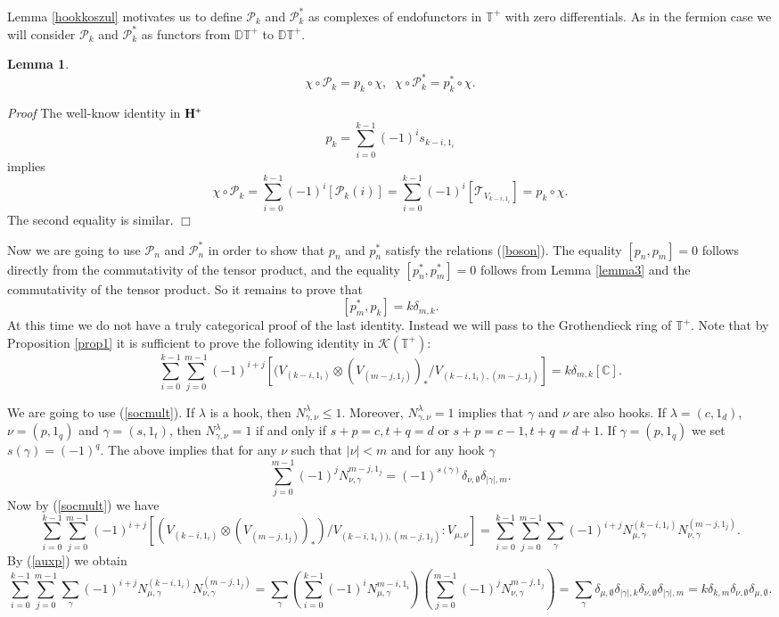 \documentclass[11pt]{amsart}
\newcounter{theorem}
\newtheorem{lemma}[theo]{Lemma}
\renewenvironment{proof}{ \emph{Proof}}{$\Box$}
\newcommand{\TT}{\mathbb{T}}
\begin{document}
Lemma \ref{hookkoszul} motivates us to define $\mathcal P_k$ and $\mathcal P^*_k$ as complexes of endofunctors in $\TT^+$ with zero differentials.
As in the fermion case we will consider $\mathcal P_k$ and $\mathcal P^*_k$ as functors from  $\mathbb{DT}^+$ to $\mathbb{DT}^+$.

\begin{lemma}\label{cath}
$$\chi\circ\mathcal P_k=p_k\circ\chi,\;\;\chi\circ\mathcal P^*_k=p^*_k\circ\chi.$$
\end{lemma} 
\begin{proof} The well-know identity \cite{M} in $\bold{H}^+$
$$p_k=\sum_{i=0}^{k-1} (-1)^i s_{k-i,1_i}$$
implies 
$$\chi\circ\mathcal P_k=\sum_{i=0}^{k-1}(-1)^i[\mathcal P_k(i)]=\sum_{i=0}^{k-1} (-1)^i[\mathcal T_{V_{k-i,1_i}}]=p_k\circ\chi.$$
The second equality is similar.
\end{proof}

Now we are going to use $\mathcal P_n$ and $\mathcal P_n^*$ in order
to show that $p_n$ and $p^*_n$ satisfy the relations
(\ref{boson}). 
The equality $[p_n,p_m]=0$ follows directly from the
commutativity of the tensor product, and the equality  $[p^*_n,p^*_m]=0$ follows from
Lemma \ref{lemma3} and the commutativity of the tensor product. So it
remains to prove that
$$[p_m^*,p_k]=k\delta_{m,k}.$$
At this time we do not have a truly categorical proof of the last identity. Instead we will pass to the Grothendieck ring of
$\TT^+$.
Note that by Proposition \ref{prop1} it is sufficient to prove the
following identity in $\mathcal K(\TT^+)$: 
\begin{equation}\label{hookid}
\sum_{i=0}^{k-1}\sum_{j=0}^{m-1}(-1)^{i+j}[(V_{(k-i,1_i)}\otimes
  (V_{(m-j,1_j)})_*/V_{(k-i,1_i),(m-j,1_j)}]=k\delta_{m,k}[\mathbb C].\nonumber
\end{equation}

We are going to use (\ref{socmult}). If $\lambda$ is a hook, then
$N^\lambda_{\gamma,\nu}\leq  1$. Moreover, $N^\lambda_{\gamma,\nu}=1$
implies that $\gamma$ and $\nu$ are also hooks. If
$\lambda=(c,1_d)$, $\nu=(p,1_q)$ and $\gamma=(s,1_t)$, then $N^\lambda_{\gamma,\nu}=1$
if and only if $s+p=c,t+q=d$ or $s+p=c-1,t+q=d+1$.
If $\gamma=(p,1_q)$ we set $s(\gamma)=(-1)^q$. The above implies that for any $\nu$ such that $|\nu|< m$ and for any hook $\gamma$
\begin{equation}\label{auxp}
\sum_{j=0}^{m-1}(-1)^j N^{m-j,1_j}_{\nu,\gamma}=(-1)^{s(\gamma)}\delta_{\nu,\emptyset}\delta_{|\gamma|,m}.
\end{equation}
Now by  (\ref{socmult}) we have 
$$\sum_{i=0}^{k-1}\sum_{j=0}^{m-1}(-1)^{i+j}[(V_{(k-i,1_i)}\otimes
  (V_{(m-j,1_j)})_*)/V_{(k-i,1_i)),(m-j,1_j)}:V_{\mu,\nu}]=\sum_{i=0}^{k-1}\sum_{j=0}^{m-1}\sum_{\gamma}(-1)^{i+j}N^{(k-i,1_i)}_{\mu,\gamma}N^{(m-j,1_j)}_{\nu,\gamma}.$$
By (\ref{auxp}) we obtain
$$\sum_{i=0}^{k-1}\sum_{j=0}^{m-1}\sum_{\gamma}(-1)^{i+j}N^{(k-i,1_i)}_{\mu,\gamma}N^{(m-j,1_j)}_{\nu,\gamma}=
\sum_{\gamma}\left(\sum_{i=0}^{k-1}(-1)^i N^{m-i,1_i}_{\mu,\gamma}\right)\left(\sum_{j=0}^{m-1}(-1)^j N^{m-j,1_j}_{\nu,\gamma}\right)=
\sum_{\gamma}\delta_{\mu,\emptyset}\delta_{|\gamma|,k}\delta_{\nu,\emptyset}\delta_{|\gamma|,m}=k\delta_{k,m}\delta_{\nu,\emptyset}\delta_{\mu,\emptyset}.$$
\end{document}
